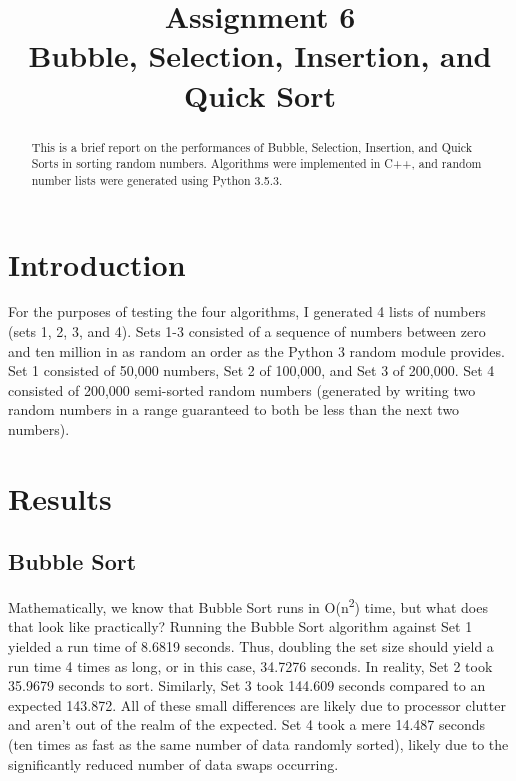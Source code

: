 \documentclass[conference]{IEEEtran}
\begin{document}
\title{Assignment 6\\
{\footnotesize Bubble, Selection, Insertion, and Quick Sort}
}

\author{
}

\maketitle

\begin{abstract}
This is a brief report on the performances of Bubble, Selection, Insertion, and Quick Sorts in sorting random numbers.
Algorithms were implemented in C++, and random number lists were generated using Python 3.5.3.
\end{abstract}

\section{Introduction}
For the purposes of testing the four algorithms, I generated 4 lists of numbers (sets 1, 2, 3, and 4).
Sets 1-3 consisted of a sequence of numbers between zero and ten million in as random an order as the Python 3 random module provides.
Set 1 consisted of 50,000 numbers, Set 2 of 100,000, and Set 3 of 200,000.
Set 4 consisted of 200,000 semi-sorted random numbers (generated by writing two random numbers in a range guaranteed to both be less than the next two numbers).

\section{Results}

\subsection{Bubble Sort}

Mathematically, we know that Bubble Sort runs in O(n\textsuperscript{2}) time, but what does that look like practically?
Running the Bubble Sort algorithm against Set 1 yielded a run time of 8.6819 seconds.
Thus, doubling the set size should yield a run time 4 times as long, or in this case, 34.7276 seconds.
In reality, Set 2 took 35.9679 seconds to sort. Similarly, Set 3 took 144.609 seconds compared to an expected 143.872.
All of these small differences are likely due to processor clutter and aren't out of the realm of the expected.
Set 4 took a mere 14.487 seconds (ten times as fast as the same number of data randomly sorted), likely due to the significantly reduced number of data swaps occurring.
\end{document}
